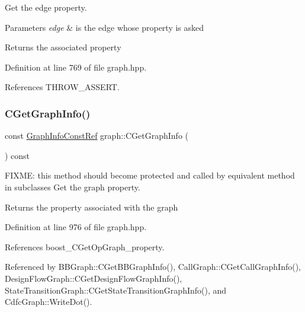 Get the edge property. 


\begin{DoxyParams}{Parameters}
{\em edge} & is the edge whose property is asked \\
\hline
\end{DoxyParams}
\begin{DoxyReturn}{Returns}
the associated property 
\end{DoxyReturn}


Definition at line 769 of file graph.\+hpp.



References T\+H\+R\+O\+W\+\_\+\+A\+S\+S\+E\+RT.

\mbox{\label{structgraph_a5e08b475b11e2ae0a451c3834a2f2e7b}} 
\subsubsection{\texorpdfstring{C\+Get\+Graph\+Info()}{CGetGraphInfo()}}
{\footnotesize\ttfamily const \hyperlink{graph__info_8hpp_a702acdabd1425f04d03069d60d5d56e2}{Graph\+Info\+Const\+Ref} graph\+::\+C\+Get\+Graph\+Info (\begin{DoxyParamCaption}{ }\end{DoxyParamCaption}) const\hspace{0.3cm}{\ttfamily [inline]}}



F\+I\+X\+ME\+: this method should become protected and called by equivalent method in subclasses Get the graph property. 

\begin{DoxyReturn}{Returns}
the property associated with the graph 
\end{DoxyReturn}


Definition at line 976 of file graph.\+hpp.



References boost\+\_\+\+C\+Get\+Op\+Graph\+\_\+property.



Referenced by B\+B\+Graph\+::\+C\+Get\+B\+B\+Graph\+Info(), Call\+Graph\+::\+C\+Get\+Call\+Graph\+Info(), Design\+Flow\+Graph\+::\+C\+Get\+Design\+Flow\+Graph\+Info(), State\+Transition\+Graph\+::\+C\+Get\+State\+Transition\+Graph\+Info(), and Cdfc\+Graph\+::\+Write\+Dot().

